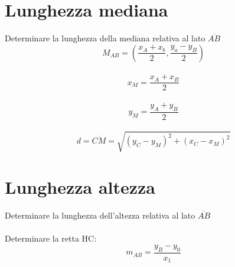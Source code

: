 \documentclass[12pt]{book}
\begin{document}
				\section{Lunghezza mediana}
				Determinare la lunghezza della mediana relativa al lato $\overline{AB}$
				\\
				\[M_{AB}=\left(\frac{x_A+x_b}{2},\frac{y_a-y_B}{2}\right)\] 
				\\
				\[x_M=\frac{x_A+x_B}{2}\]
				\\
				\[y_M=\frac{y_A+y_B}{2}\]
				\\
				\[d=\overline{CM}=\sqrt{(y_C-y_M)^2+(x_C-x_M)^2}\]
				\section{Lunghezza altezza}
				Determinare la lunghezza dell'altezza relativa al lato $\overline{AB}$ 
				\\
				\\
				Determinare la retta HC:
				\\
				\[m_{AB}=\frac{y_B-y_0}{x_1}\]
			
\end{document}
